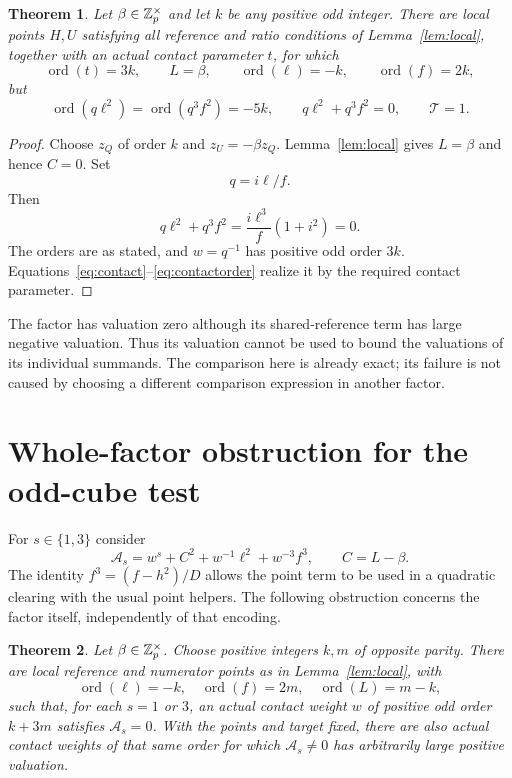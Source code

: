 \documentclass[11pt,a4paper]{article}
\newtheorem{theorem}{Theorem}[section]
\theoremstyle{remark}\newtheorem{remark}[theorem]{Remark}
\begin{document}
\begin{theorem}\label{thm:squared}
Let $\beta\in\mathbb Z_p^\times$ and let $k$ be any positive odd integer.
There are local points $H,U$ satisfying all reference and ratio
conditions of Lemma~\ref{lem:local}, together with an actual
contact parameter $t$, for which
\[
 \operatorname{ord}(t)=3k,\qquad L=\beta,\qquad
 \operatorname{ord}(\ell)=-k,\qquad\operatorname{ord}(f)=2k,
\]
but
\[
 \operatorname{ord}(q\ell^2)=\operatorname{ord}(q^3f^2)=-5k,
 \qquad q\ell^2+q^3f^2=0,\qquad\mathcal T=1.
\]
\end{theorem}

\begin{proof}
Choose $z_Q$ of order $k$ and $z_U=-\beta z_Q$.
Lemma~\ref{lem:local} gives $L=\beta$ and hence $C=0$.
Set
\[
                              q=i\ell/f.
\]
Then
\[
                q\ell^2+q^3f^2
                 =\frac{i\ell^3}{f}(1+i^2)=0.
\]
The orders are as stated, and $w=q^{-1}$ has positive odd order
$3k$. Equations~\eqref{eq:contact}--\eqref{eq:contactorder}
realize it by the required contact parameter.
\end{proof}

The factor has valuation zero although its shared-reference term has
large negative valuation. Thus its valuation cannot be used to bound
the valuations of its individual summands. The comparison here is
already exact; its failure is not caused by choosing a different
comparison expression in another factor.

\section{Whole-factor obstruction for the odd-cube test}
For $s\in\{1,3\}$ consider
\begin{equation}\label{eq:cube}
      \mathcal A_s=w^s+C^2+w^{-1}\ell^2+w^{-3}f^3,
      \qquad C=L-\beta.
\end{equation}
The identity $f^3=(f-h^2)/D$ allows the point term to be used in
a quadratic clearing with the usual point helpers. The following
obstruction concerns the factor itself, independently of that encoding.

\begin{theorem}\label{thm:cube}
Let $\beta\in\mathbb Z_p^\times$. Choose positive integers $k,m$ of
opposite parity. There are local reference and numerator points as
in Lemma~\ref{lem:local}, with
\[
 \operatorname{ord}(\ell)=-k,\quad\operatorname{ord}(f)=2m,
 \quad\operatorname{ord}(L)=m-k,
\]
such that, for each $s=1$ or $3$, an actual contact weight $w$ of
positive odd order $k+3m$ satisfies $\mathcal A_s=0$.
With the points and target fixed, there are also actual contact
weights of that same order for which $\mathcal A_s\ne0$ has
arbitrarily large positive valuation.
\end{theorem}
\end{document}
